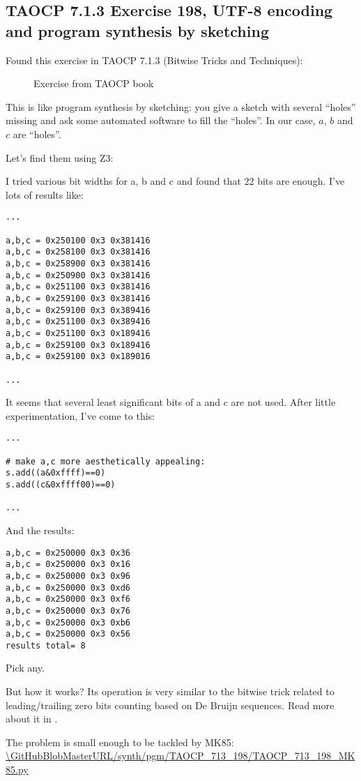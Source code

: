 \subsection{TAOCP 7.1.3 Exercise 198, UTF-8 encoding and program synthesis by sketching}

\renewcommand{\CURPATH}{synth/pgm/TAOCP_713_198}

Found this exercise in TAOCP 7.1.3 (Bitwise Tricks and Techniques):

\begin{figure}[H]
\centering
{}
\caption{Exercise from TAOCP book}
\end{figure}

This is like program synthesis by sketching: you give a sketch with several ``holes'' missing and ask some
automated software to fill the ``holes''.
In our case, $a$, $b$ and $c$ are ``holes''.

Let's find them using Z3:



I tried various bit widths for a, b and c and found that 22 bits are enough.
I've lots of results like:

\begin{lstlisting}
...

a,b,c = 0x250100 0x3 0x381416
a,b,c = 0x258100 0x3 0x381416
a,b,c = 0x258900 0x3 0x381416
a,b,c = 0x250900 0x3 0x381416
a,b,c = 0x251100 0x3 0x381416
a,b,c = 0x259100 0x3 0x381416
a,b,c = 0x259100 0x3 0x389416
a,b,c = 0x251100 0x3 0x389416
a,b,c = 0x251100 0x3 0x189416
a,b,c = 0x259100 0x3 0x189416
a,b,c = 0x259100 0x3 0x189016

...
\end{lstlisting}

It seems that several least significant bits of a and c are not used.
After little experimentation, I've come to this:

\begin{lstlisting}
...

# make a,c more aesthetically appealing:
s.add((a&0xffff)==0)
s.add((c&0xffff00)==0)

...
\end{lstlisting}

And the results:

\begin{lstlisting}
a,b,c = 0x250000 0x3 0x36
a,b,c = 0x250000 0x3 0x16
a,b,c = 0x250000 0x3 0x96
a,b,c = 0x250000 0x3 0xd6
a,b,c = 0x250000 0x3 0xf6
a,b,c = 0x250000 0x3 0x76
a,b,c = 0x250000 0x3 0xb6
a,b,c = 0x250000 0x3 0x56
results total= 8
\end{lstlisting}

Pick any.

But how it works?
Its operation is very similar to the bitwise trick related to leading/trailing zero bits counting based on De Bruijn sequences.
Read more about it in \MathForProg.

The problem is small enough to be tackled by MK85:
\url{\GitHubBlobMasterURL/\CURPATH/TAOCP_713_198_MK85.py}

